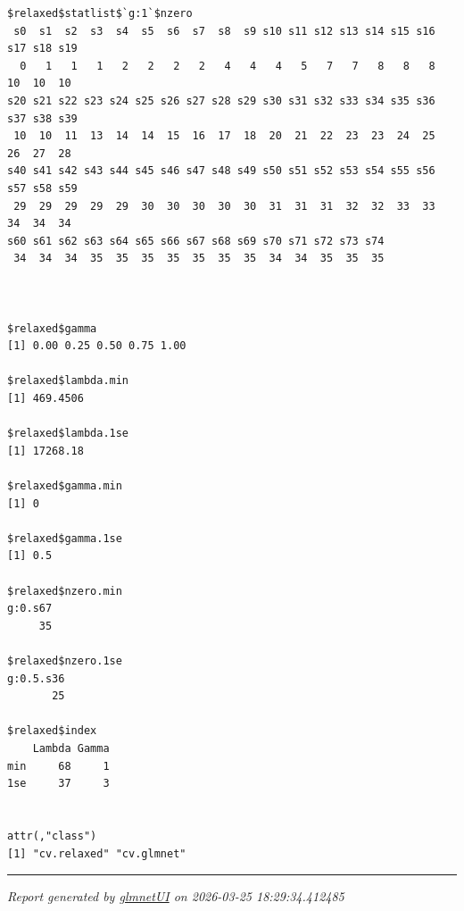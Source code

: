 \documentclass[
]{article}
\begin{document}
\begin{verbatim}
$relaxed$statlist$`g:1`$nzero
 s0  s1  s2  s3  s4  s5  s6  s7  s8  s9 s10 s11 s12 s13 s14 s15 s16 s17 s18 s19 
  0   1   1   1   2   2   2   2   4   4   4   5   7   7   8   8   8  10  10  10 
s20 s21 s22 s23 s24 s25 s26 s27 s28 s29 s30 s31 s32 s33 s34 s35 s36 s37 s38 s39 
 10  10  11  13  14  14  15  16  17  18  20  21  22  23  23  24  25  26  27  28 
s40 s41 s42 s43 s44 s45 s46 s47 s48 s49 s50 s51 s52 s53 s54 s55 s56 s57 s58 s59 
 29  29  29  29  29  30  30  30  30  30  31  31  31  32  32  33  33  34  34  34 
s60 s61 s62 s63 s64 s65 s66 s67 s68 s69 s70 s71 s72 s73 s74 
 34  34  34  35  35  35  35  35  35  35  34  34  35  35  35 



$relaxed$gamma
[1] 0.00 0.25 0.50 0.75 1.00

$relaxed$lambda.min
[1] 469.4506

$relaxed$lambda.1se
[1] 17268.18

$relaxed$gamma.min
[1] 0

$relaxed$gamma.1se
[1] 0.5

$relaxed$nzero.min
g:0.s67 
     35 

$relaxed$nzero.1se
g:0.5.s36 
       25 

$relaxed$index
    Lambda Gamma
min     68     1
1se     37     3


attr(,"class")
[1] "cv.relaxed" "cv.glmnet" 
\end{verbatim}

\begin{center}\rule{0.5\linewidth}{0.5pt}\end{center}

\emph{Report generated by
\href{https://github.com/wcraytor/glmnetUI}{glmnetUI} on 2026-03-25
18:29:34.412485}
\end{document}

